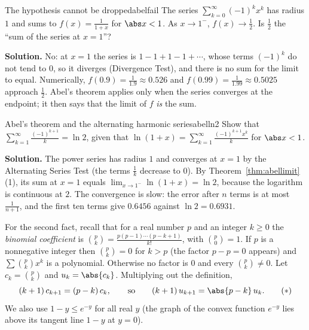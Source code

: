 \documentclass[11pt]{article}
\begin{document}
\begin{exmp}{The hypothesis cannot be dropped}{abelfail}
The series $\sum_{k=0}^\infty(-1)^kx^k$ has radius $1$ and sums to $f(x)=\frac1{1+x}$ for $\abs x<1$. As $x\to1^-$, $f(x)\to\frac12$. Is $\frac12$ the ``sum of the series at $x=1$''?

\textbf{Solution.} No: at $x=1$ the series is $1-1+1-1+\cdots$, whose terms $(-1)^k$ do not tend to $0$, so it diverges (Divergence Test), and there is no sum for the limit to equal. Numerically, $f(0.9)=\frac1{1.9}\approx0.526$ and $f(0.99)=\frac1{1.99}\approx0.5025$ approach $\frac12$. Abel's theorem applies only when the series converges at the endpoint; it then says that the limit of $f$ \emph{is} the sum.
\end{exmp}

\begin{exmp}{Abel's theorem and the alternating harmonic series}{abelln2}
Show that $\sum_{k=1}^\infty\frac{(-1)^{k+1}}k=\ln2$, given that $\ln(1+x)=\sum_{k=1}^\infty\frac{(-1)^{k+1}x^k}k$ for $\abs x<1$.

\textbf{Solution.} The power series has radius $1$ and converges at $x=1$ by the Alternating Series Test (the terms $\frac1k$ decrease to $0$). By Theorem~\ref{thm:abellimit}(1), its sum at $x=1$ equals $\lim_{x\to1^-}\ln(1+x)=\ln2$, because the logarithm is continuous at $2$. The convergence is slow: the error after $n$ terms is at most $\frac1{n+1}$, and the first ten terms give $0.6456$ against $\ln2=0.6931$.
\end{exmp}

For the second fact, recall that for a real number $p$ and an integer $k\ge0$ the \emph{binomial coefficient} is $\binom pk=\frac{p(p-1)\cdots(p-k+1)}{k!}$, with $\binom p0=1$. If $p$ is a nonnegative integer then $\binom pk=0$ for $k>p$ (the factor $p-p=0$ appears) and $\sum\binom pkx^k$ is a polynomial. Otherwise no factor is $0$ and every $\binom pk\ne0$. Let $c_k=\binom pk$ and $u_k=\abs{c_k}$. Multiplying out the definition,
\[
(k+1)\,c_{k+1}=(p-k)\,c_k,\qquad\text{so}\qquad(k+1)\,u_{k+1}=\abs{p-k}\,u_k .\tag{$\ast$}
\]
We also use $1-y\le e^{-y}$ for all real $y$ (the graph of the convex function $e^{-y}$ lies above its tangent line $1-y$ at $y=0$).
\end{document}

